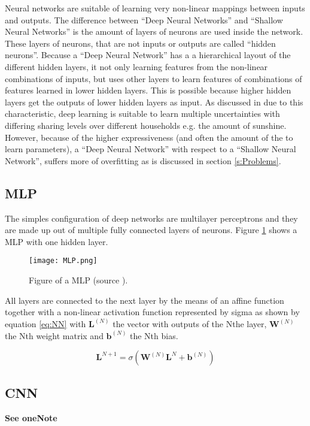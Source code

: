 Neural networks are suitable of learning very non-linear mappings between inputs and outputs. The difference between ``Deep Neural Networks'' and ``Shallow Neural Networks'' is the amount of layers of neurons are used inside the network. These layers of neurons, that are not inputs or outputs are called ``hidden neurons''. Because a ``Deep Neural Network'' has a a hierarchical layout of the different hidden layers, it not only learning features from the non-linear combinations of inputs, but uses other layers to learn features of combinations of features learned in lower hidden layers. This is possible because higher hidden layers get the outputs of lower hidden layers as input. As discussed in  \cite{Shi2018} due to this characteristic, deep learning is suitable to learn multiple uncertainties with differing sharing levels over different households e.g. the amount of sunshine. However, because of the higher expressiveness (and often the amount of the to learn parameters), a ``Deep Neural Network'' with respect to a ``Shallow Neural Network'', suffers more of overfitting as is discussed in section \ref{s:Problems}.

\subsection{MLP}
The simples configuration of deep networks are multilayer perceptrons and they are made up out of multiple fully connected layers of neurons. Figure \ref{fig:MLP} shows a MLP with one hidden layer.

\begin{figure}[h!]
	\centering
	\texttt{[image: MLP.png]}
	\caption{Figure of a MLP (source \cite{Czum2020}).}
	\label{fig:MLP}
\end{figure}

All layers are connected to the next layer by the means of an affine function together with a non-linear activation function represented by sigma as shown by equation \ref{eq:NN} with $ \textbf{L}^{(N)} $ the vector with outputs of the Nthe layer, $ \textbf{W}^(N) $ the Nth weight matrix and $ \textbf{b}^{(N)} $ the Nth bias. 


\begin{equation}\label{eq:NN}
	\textbf{L}^{N+1} = \sigma(\textbf{W}^{(N)}\textbf{L}^{N}+\textbf{b}^{(N)})
\end{equation}


\subsection{CNN}
\textbf{See oneNote}

